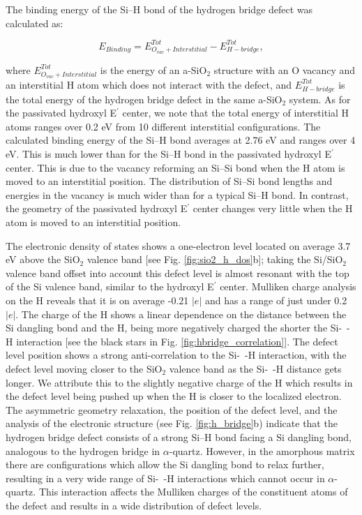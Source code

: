 \documentclass[aps,prb,reprint,superscriptaddress,showpacs]{revtex4-1}
\begin{document}
The binding energy of the \mbox{Si--H} bond of the hydrogen bridge defect was calculated as:

\begin{equation}
E_{Binding}=E^{Tot}_{O_{vac} + Interstitial}-E^{Tot}_{H-bridge},
\end{equation}

where $E^{Tot}_{O_{vac} + Interstitial}$ is the energy of an a-SiO$_2$ structure with an O vacancy and an interstitial H atom which does not interact with the defect, and $E^{Tot}_{H-bridge}$ is the total energy of the hydrogen bridge defect in the same a-SiO$_2$ system. As for the passivated hydroxyl E$^\prime$ center, we note that the total energy of interstitial H atoms ranges over 0.2 eV from 10 different interstitial configurations. The calculated binding energy of the \mbox{Si--H} bond averages at 2.76 eV and ranges over 4 eV. This is much lower than for the \mbox{Si--H} bond in the passivated hydroxyl E$^\prime$ center. This is due to the vacancy reforming an \mbox{Si--Si} bond when the H atom is moved to an interstitial position. The distribution of \mbox{Si--Si} bond lengths and energies in the vacancy is much wider than for a typical \mbox{Si--H} bond. In contrast, the geometry of the passivated hydroxyl E$^\prime$ center changes very little when the H atom is moved to an interstitial position.


The electronic density of states shows a one-electron level located on average 3.7 eV above the SiO$_2$ valence band [see Fig. \ref{fig:sio2_h_dos}b]; taking the Si/SiO$_2$ valence band offset into account this defect level is almost resonant with the top of the Si valence band, similar to the hydroxyl E$^\prime$ center. Mulliken charge analysis on the H reveals that it is on average -0.21 $|e|$ and has a range of just under 0.2 $|e|$. The charge of the H shows a linear dependence on the distance between the Si dangling bond and the H, being more negatively charged the shorter the \mbox{Si- -H} interaction [see the black stars in Fig. \ref{fig:hbridge_correlation}]. The defect level position shows a strong anti-correlation to the \mbox{Si- -H} interaction, with the defect level moving closer to the SiO$_2$ valence band as the \mbox{Si- -H} distance gets longer. We attribute this to the slightly negative charge of the H which results in the defect level being pushed up when the H is closer to the localized electron. The asymmetric geometry relaxation, the position of the defect level, and the analysis of the electronic structure (see Fig. \ref{fig:h_bridge}b) indicate that the hydrogen bridge defect consists of a strong \mbox{Si--H} bond facing a Si dangling bond, analogous to the hydrogen bridge in $\alpha$-quartz. However, in the amorphous matrix there are configurations which allow the Si dangling bond to relax further, resulting in a very wide range of \mbox{Si- -H} interactions which cannot occur in $\alpha$-quartz. This interaction affects the Mulliken charges of the constituent atoms of the defect and results in a wide distribution of defect levels.
\end{document}
